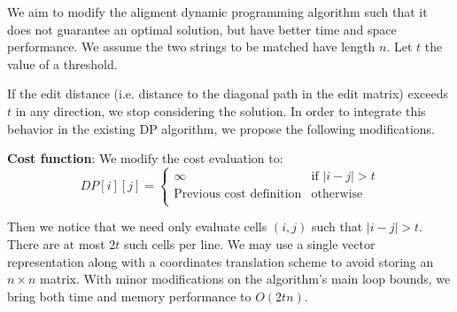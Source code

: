 
We aim to modify the aligment dynamic programming algorithm such that it does not guarantee an optimal solution, but have better time and space performance. We assume the two strings to be matched have length $n$. Let $t$ the value of a threshold.

If the edit distance (i.e. distance to the diagonal path in the edit matrix) exceeds $t$ in any direction, we stop considering the solution. In order to integrate this behavior in the existing DP algorithm, we propose the following modifications.

\textbf{Cost function}: We modify the cost evaluation to:
\[
  DP[i][j] = \left \{
    \begin{array}{ll}
      \infty & \text{if } |i - j| > t \\
      \text{Previous cost definition} & \text{otherwise} \\
    \end{array}
  \right.
\]

Then we notice that we need only evaluate cells $(i, j)$ such that $|i - j| > t$. There are at most $2t$ such cells per line. We may use a single vector representation along with a coordinates translation scheme to avoid storing an $n \times n$ matrix. With minor modifications on the algorithm's main loop bounds, we bring both time and memory performance to $O(2tn)$.